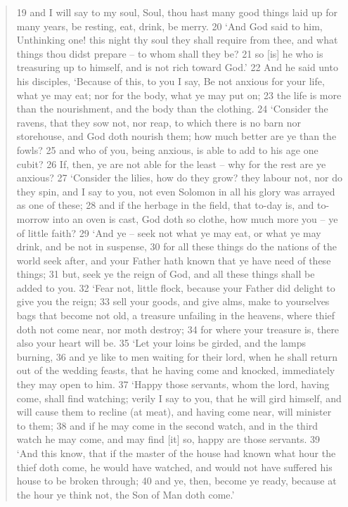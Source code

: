 \documentclass[11pt]{article}
\begin{document}
\begin{quote}
19 and I will say to my soul, Soul, thou hast many good things laid up for many years, be resting, eat, drink, be merry.
20 `And God said to him, Unthinking one! this night thy soul they shall require from thee, and what things thou didst prepare -- to whom shall they be?
21 so [is] he who is treasuring up to himself, and is not rich toward God.'
22 And he said unto his disciples, `Because of this, to you I say, Be not anxious for your life, what ye may eat; nor for the body, what ye may put on;
23 the life is more than the nourishment, and the body than the clothing.
24 `Consider the ravens, that they sow not, nor reap, to which there is no barn nor storehouse, and God doth nourish them; how much better are ye than the fowls?
25 and who of you, being anxious, is able to add to his age one cubit?
26 If, then, ye are not able for the least -- why for the rest are ye anxious?
27 `Consider the lilies, how do they grow? they labour not, nor do they spin, and I say to you, not even Solomon in all his glory was arrayed as one of these;
28 and if the herbage in the field, that to-day is, and to-morrow into an oven is cast, God doth so clothe, how much more you -- ye of little faith?
29 `And ye -- seek not what ye may eat, or what ye may drink, and be not in suspense,
30 for all these things do the nations of the world seek after, and your Father hath known that ye have need of these things;
31 but, seek ye the reign of God, and all these things shall be added to you.
32 `Fear not, little flock, because your Father did delight to give you the reign;
33 sell your goods, and give alms, make to yourselves bags that become not old, a treasure unfailing in the heavens, where thief doth not come near, nor moth destroy;
34 for where your treasure is, there also your heart will be.
35 `Let your loins be girded, and the lamps burning,
36 and ye like to men waiting for their lord, when he shall return out of the wedding feasts, that he having come and knocked, immediately they may open to him.
37 `Happy those servants, whom the lord, having come, shall find watching; verily I say to you, that he will gird himself, and will cause them to recline (at meat), and having come near, will minister to them;
38 and if he may come in the second watch, and in the third watch he may come, and may find [it] so, happy are those servants.
39 `And this know, that if the master of the house had known what hour the thief doth come, he would have watched, and would not have suffered his house to be broken through;
40 and ye, then, become ye ready, because at the hour ye think not, the Son of Man doth come.'

\end{quote}
\end{document}
